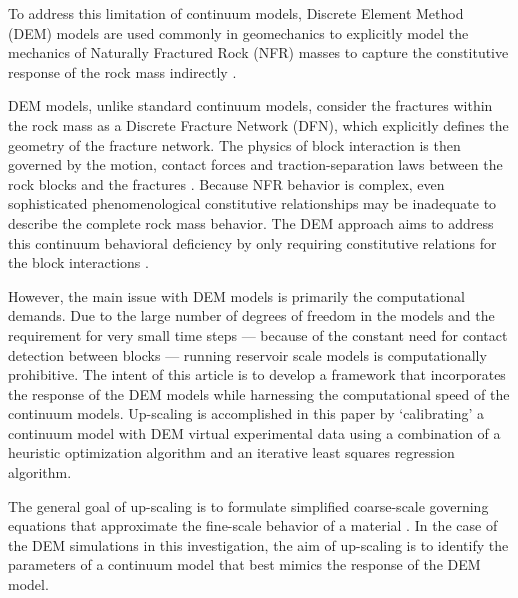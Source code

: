 To address this limitation of continuum models, Discrete Element Method (DEM) models are used commonly in geomechanics to explicitly model the mechanics of Naturally Fractured Rock (NFR) masses to capture the constitutive response of the rock mass indirectly \citep{jing_review_2003}. 

DEM models, unlike standard continuum models, consider the fractures within the rock mass as a Discrete Fracture Network (DFN), which explicitly defines the geometry of the fracture network. The physics of block interaction is then governed by the motion, contact forces and traction-separation laws between the rock blocks and the fractures \citep{Thallak_1990}. Because NFR behavior is complex, even sophisticated phenomenological constitutive relationships may be inadequate to describe the complete rock mass behavior. The DEM approach aims to address this continuum behavioral deficiency by only requiring constitutive relations for the block interactions \cite{Barbosa_1990}.

However, the main issue with DEM models is primarily the computational demands. Due to the large number of degrees of freedom in the models and the requirement for very small time steps — because of the constant need for contact detection between blocks — running reservoir scale models is computationally prohibitive. The intent of this article is to develop a framework that incorporates the response of the DEM models while harnessing the computational speed of the continuum models. Up-scaling is accomplished in this paper by ‘calibrating’ a continuum model with DEM virtual experimental data using a combination of a heuristic optimization algorithm and an iterative least squares regression algorithm.

The general goal of up-scaling is to formulate simplified coarse-scale governing equations that approximate the fine-scale behavior of a material \citep{Geers_2010}. In the case of the DEM simulations in this investigation, the aim of up-scaling is to identify the parameters of a continuum model that best mimics the response of the DEM model.


